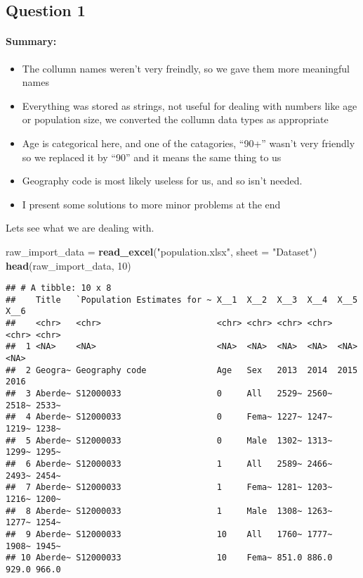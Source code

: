 \documentclass[]{article}
\newenvironment{Shaded}{\begin{snugshade}}{\end{snugshade}}
\newcommand{\KeywordTok}[1]{\textcolor[rgb]{0.13,0.29,0.53}{\textbf{#1}}}
\newcommand{\DataTypeTok}[1]{\textcolor[rgb]{0.13,0.29,0.53}{#1}}
\newcommand{\DecValTok}[1]{\textcolor[rgb]{0.00,0.00,0.81}{#1}}
\newcommand{\StringTok}[1]{\textcolor[rgb]{0.31,0.60,0.02}{#1}}
\newcommand{\NormalTok}[1]{#1}
\providecommand{\tightlist}{%
  \setlength{\itemsep}{0pt}\setlength{\parskip}{0pt}}
\let\oldparagraph\paragraph
\renewcommand{\paragraph}[1]{\oldparagraph{#1}\mbox{}}
\begin{document}
\subsection{Question 1}\label{question-1}

\paragraph{Summary:}\label{summary}

\begin{itemize}
\tightlist
\item
  The collumn names weren't very freindly, so we gave them more
  meaningful names
\item
  Everything was stored as strings, not useful for dealing with numbers
  like age or population size, we converted the collumn data types as
  appropriate
\item
  Age is categorical here, and one of the catagories, ``90+'' wasn't
  very friendly so we replaced it by ``90'' and it means the same thing
  to us
\item
  Geography code is most likely useless for us, and so isn't needed.
\item
  I present some solutions to more minor problems at the end
\end{itemize}

Lets see what we are dealing with.

\begin{Shaded}
\begin{Highlighting}[]
\NormalTok{raw_import_data =}\StringTok{ }\KeywordTok{read_excel}\NormalTok{(}\StringTok{"population.xlsx"}\NormalTok{, }\DataTypeTok{sheet =} \StringTok{"Dataset"}\NormalTok{)}
\KeywordTok{head}\NormalTok{(raw_import_data, }\DecValTok{10}\NormalTok{)}
\end{Highlighting}
\end{Shaded}

\begin{verbatim}
## # A tibble: 10 x 8
##    Title   `Population Estimates for ~ X__1  X__2  X__3  X__4  X__5  X__6 
##    <chr>   <chr>                       <chr> <chr> <chr> <chr> <chr> <chr>
##  1 <NA>    <NA>                        <NA>  <NA>  <NA>  <NA>  <NA>  <NA> 
##  2 Geogra~ Geography code              Age   Sex   2013  2014  2015  2016 
##  3 Aberde~ S12000033                   0     All   2529~ 2560~ 2518~ 2533~
##  4 Aberde~ S12000033                   0     Fema~ 1227~ 1247~ 1219~ 1238~
##  5 Aberde~ S12000033                   0     Male  1302~ 1313~ 1299~ 1295~
##  6 Aberde~ S12000033                   1     All   2589~ 2466~ 2493~ 2454~
##  7 Aberde~ S12000033                   1     Fema~ 1281~ 1203~ 1216~ 1200~
##  8 Aberde~ S12000033                   1     Male  1308~ 1263~ 1277~ 1254~
##  9 Aberde~ S12000033                   10    All   1760~ 1777~ 1908~ 1945~
## 10 Aberde~ S12000033                   10    Fema~ 851.0 886.0 929.0 966.0
\end{verbatim}
\end{document}
